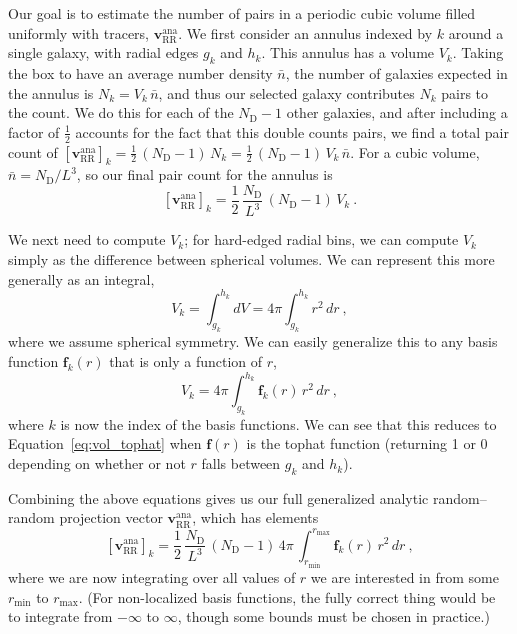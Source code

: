 \documentclass[modern]{aastex62}
\newcommand{\bld}[1]{\bm{#1}} %
\newcommand{\vv}[1]{\bld{v}_\mathrm{#1}}
\newcommand{\ff}{\bld{f}}
\newcommand{\NN}[1]{N_\mathrm{#1}}
\begin{document}
Our goal is to estimate the number of pairs in a periodic cubic volume filled uniformly with tracers, $\vv{RR}^\mathrm{ana}$. 
We first consider an annulus indexed by $k$ around a single galaxy, with radial edges $g_k$ and $h_k$. 
This annulus has a volume $V_k$.
Taking the box to have an average number density $\bar{n}$, the number of galaxies expected in the annulus is $N_k = V_k \, \bar{n}$, and thus our selected galaxy contributes $N_k$ pairs to the count.   
We do this for each of the $\NN{D}-1$ other galaxies, and after including a factor of $\frac{1}{2}$ accounts for the fact that this double counts pairs, we find a total pair count of $\left[ \vv{RR}^\mathrm{ana} \right]_k = \frac{1}{2} \, (\NN{D}-1) \, N_k = \frac{1}{2} \, (\NN{D}-1) \, V_k \, \bar{n}$.
For a cubic volume, $\bar{n} = \NN{D}/L^3$, so our final pair count for the annulus is 
\begin{equation}
\left[ \vv{RR}^\mathrm{ana} \right]_k = \frac{1}{2} \, \frac{\NN{D}}{L^3} \, (\NN{D}-1) \, V_k ~.
\end{equation}

We next need to compute $V_k$; for hard-edged radial bins, we can compute $V_k$ simply as the difference between spherical volumes. 
We can represent this more generally as an integral,
\begin{equation} \label{eq:vol_tophat}
V_k = \int_{g_k}^{h_k} dV = 4\pi \int_{g_k}^{h_k} r^2 \, dr ~,
\end{equation}
where we assume spherical symmetry.
We can easily generalize this to any basis function $\ff_k(r)$ that is only a function of $r$,
\begin{equation}
V_k = 4\pi  \int_{g_k}^{h_k} \ff_k(r) \, r^2 \, dr ~,
\end{equation}
where $k$ is now the index of the basis functions.
We can see that this reduces to Equation~\ref{eq:vol_tophat} when $\ff(r)$ is the tophat function (returning 1 or 0 depending on whether or not $r$ falls between $g_k$ and $h_k$).

Combining the above equations gives us our full generalized analytic random--random projection vector $\vv{RR}^\mathrm{ana}$, which has elements
\begin{equation}
\left[ \vv{RR}^\mathrm{ana} \right]_k = \frac{1}{2} \, \frac{\NN{D}}{L^3} \,(\NN{D}-1) \, 4\pi \, \int_{r_\mathrm{min}}^{r_\mathrm{max}} \ff_k(r) \, r^2 \, dr ~,
\end{equation}
where we are now integrating over all values of $r$ we are interested in from some $r_\mathrm{min}$ to $r_\mathrm{max}$.
(For non-localized basis functions, the fully correct thing would be to integrate from $-\infty$ to $\infty$, though some bounds must be chosen in practice.)
\end{document}
